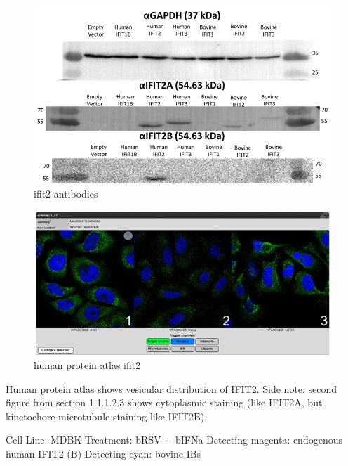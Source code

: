 \begin{figure}
    \centering
    \includegraphics[width=1\linewidth]{10. Chapter 5/Figs/05. IFIT2AB Discussion/01. antibodies ifit2.png}
    \caption[ifit2 antibodies]{ifit2 antibodies}
    \label{fig:ifit2 antibodies}
\end{figure}

\begin{figure}
    \centering
    \includegraphics[width=1\linewidth]{10. Chapter 5/Figs/05. IFIT2AB Discussion/02. human protein atlas ifit2.png}
    \caption[human protein atlas ifit2]{human protein atlas ifit2}
    \label{fig:human protein atlas ifit2}
\end{figure}

Human protein atlas shows vesicular distribution of IFIT2.
Side note: second figure from section 1.1.1.2.3 shows cytoplasmic staining (like IFIT2A, but kinetochore microtubule staining like IFIT2B).

Cell Line: MDBK \newline
Treatment: bRSV + bIFNa \newline
Detecting magenta: endogenous human IFIT2 (B) \newline
Detecting cyan: bovine IBs \newline

